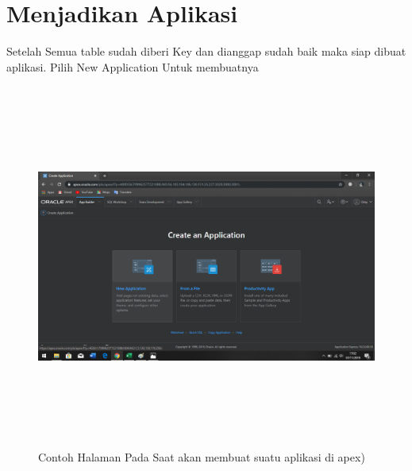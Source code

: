 \documentclass[a4, 13pt]{article}
\begin{document}
     \section{Menjadikan Aplikasi}
     Setelah Semua table sudah diberi Key dan dianggap sudah baik maka siap dibuat aplikasi. Pilih New Application Untuk membuatnya
     \begin{figure}[!htbp]
        \centering
        \includegraphics[width=16cm, height=12cm]{pictures/I.png}
        \caption{Contoh Halaman Pada Saat akan membuat suatu aplikasi di apex)}
        \label{fig:my_label}
    \end{figure}
    
\end{document}
